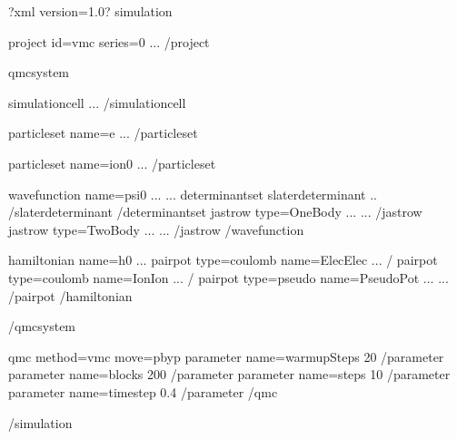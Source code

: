 \documentclass[letterpaper,10pt,english]{sphinxmanual}
\begin{document}
\begin{sphinxVerbatim}[commandchars=\\\{\}]
\PYGZlt{}?xml version=\PYGZdq{}1.0\PYGZdq{}?\PYGZgt{}
\PYGZlt{}simulation\PYGZgt{}

\PYGZlt{}project id=\PYGZdq{}vmc\PYGZdq{} series=\PYGZdq{}0\PYGZdq{}\PYGZgt{}
  ...
\PYGZlt{}/project\PYGZgt{}

\PYGZlt{}qmcsystem\PYGZgt{}

  \PYGZlt{}simulationcell\PYGZgt{}
    ...
  \PYGZlt{}/simulationcell\PYGZgt{}

  \PYGZlt{}particleset name=\PYGZdq{}e\PYGZdq{}\PYGZgt{}
    ...
  \PYGZlt{}/particleset\PYGZgt{}

  \PYGZlt{}particleset name=\PYGZdq{}ion0\PYGZdq{}\PYGZgt{}
    ...
  \PYGZlt{}/particleset\PYGZgt{}

  \PYGZlt{}wavefunction name=\PYGZdq{}psi0\PYGZdq{} ... \PYGZgt{}
    ...
    \PYGZlt{}determinantset\PYGZgt{}
      \PYGZlt{}slaterdeterminant\PYGZgt{}
        ..
      \PYGZlt{}/slaterdeterminant\PYGZgt{}
    \PYGZlt{}/determinantset\PYGZgt{}
    \PYGZlt{}jastrow type=\PYGZdq{}One\PYGZhy{}Body\PYGZdq{} ... \PYGZgt{}
       ...
    \PYGZlt{}/jastrow\PYGZgt{}
    \PYGZlt{}jastrow type=\PYGZdq{}Two\PYGZhy{}Body\PYGZdq{} ... \PYGZgt{}
      ...
    \PYGZlt{}/jastrow\PYGZgt{}
  \PYGZlt{}/wavefunction\PYGZgt{}

  \PYGZlt{}hamiltonian name=\PYGZdq{}h0\PYGZdq{} ... \PYGZgt{}
    \PYGZlt{}pairpot type=\PYGZdq{}coulomb\PYGZdq{} name=\PYGZdq{}ElecElec\PYGZdq{} ... /\PYGZgt{}
    \PYGZlt{}pairpot type=\PYGZdq{}coulomb\PYGZdq{} name=\PYGZdq{}IonIon\PYGZdq{}   ... /\PYGZgt{}
    \PYGZlt{}pairpot type=\PYGZdq{}pseudo\PYGZdq{} name=\PYGZdq{}PseudoPot\PYGZdq{} ... \PYGZgt{}
      ...
    \PYGZlt{}/pairpot\PYGZgt{}
  \PYGZlt{}/hamiltonian\PYGZgt{}

 \PYGZlt{}/qmcsystem\PYGZgt{}

 \PYGZlt{}qmc method=\PYGZdq{}vmc\PYGZdq{} move=\PYGZdq{}pbyp\PYGZdq{}\PYGZgt{}
   \PYGZlt{}parameter name=\PYGZdq{}warmupSteps\PYGZdq{}\PYGZgt{}   20 \PYGZlt{}/parameter\PYGZgt{}
   \PYGZlt{}parameter name=\PYGZdq{}blocks\PYGZdq{}     \PYGZgt{}  200 \PYGZlt{}/parameter\PYGZgt{}
   \PYGZlt{}parameter name=\PYGZdq{}steps\PYGZdq{}      \PYGZgt{}   10 \PYGZlt{}/parameter\PYGZgt{}
   \PYGZlt{}parameter name=\PYGZdq{}timestep\PYGZdq{}   \PYGZgt{}  0.4 \PYGZlt{}/parameter\PYGZgt{}
 \PYGZlt{}/qmc\PYGZgt{}

\PYGZlt{}/simulation\PYGZgt{}
\end{sphinxVerbatim}
\end{document}
